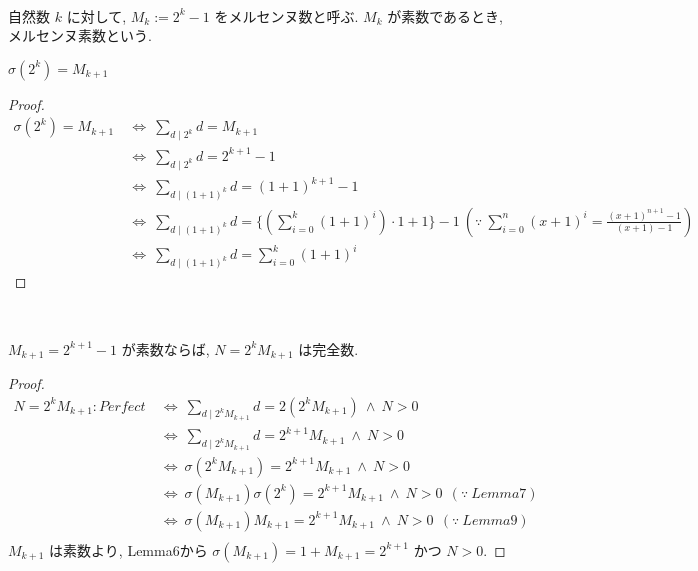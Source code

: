 \begin{definition}[メルセンヌ数]\label{Mersenne}\leanok~\

自然数 \(k\) に対して, \(M_k := 2^k - 1\) をメルセンヌ数と呼ぶ. \(M_k\) が素数であるとき,メルセンヌ素数という.

\end{definition}


\begin{lemma}\label{sigma_two_pow_eq_mersenne_succ}\leanok
{}
\(\sigma(2^k) = M_{k+1}\)
\end{lemma}

\begin{proof}
\begin{align*}
  \sigma(2^k) = M_{k+1} ~&\Leftrightarrow~ \sum_{d \mid 2^k} d = M_{k+1}\\
                        ~&\Leftrightarrow~ \sum_{d \mid 2^k} d = 2^{k+1} - 1\\
                        ~&\Leftrightarrow~ \sum_{d \mid (1+1)^k} d = (1+1)^{k+1} - 1\\
                        ~&\Leftrightarrow~ \sum_{d \mid (1+1)^k} d = \{(\sum_{i=0}^{k}(1+1)^i) \cdot 1 + 1\} - 1
                        ~(\because ~\sum_{i=0}^{n} (x+1)^i = \frac{(x+1)^{n+1}-1}{(x+1)-1})\\
                        ~&\Leftrightarrow~ \sum_{d \mid (1+1)^k} d = \sum_{i=0}^{k} (1+1)^i
\end{align*}
\end{proof}


\begin{theorem}[Euclid I]\label{perfect_two_pow_mul_mersenne_of_prime}
\leanok
{}~\

\(M_{k+1} = 2^{k+1} - 1\) が素数ならば, \(N = 2^kM_{k+1}\) は完全数.

\end{theorem}

\begin{proof}
\begin{align*}
N = 2^kM_{k+1} : Perfect ~&\Leftrightarrow~ \sum_{d \mid 2^kM_{k+1}} d = 2(2^kM_{k+1}) ~\wedge~ N > 0\\
                         ~&\Leftrightarrow~ \sum_{d \mid 2^kM_{k+1}} d = 2^{k+1}M_{k+1} ~\wedge~ N > 0\\
                         ~&\Leftrightarrow~ \sigma(2^kM_{k+1}) = 2^{k+1}M_{k+1} ~\wedge~ N > 0\\
                         ~&\Leftrightarrow~ \sigma(M_{k+1})\sigma(2^k) = 2^{k+1}M_{k+1} ~\wedge~ N > 0~~(\because~Lemma7)\\
                         ~&\Leftrightarrow~ \sigma(M_{k+1})M_{k+1} = 2^{k+1}M_{k+1} ~\wedge~ N > 0~~(\because~Lemma9)\\
\end{align*}
\(M_{k+1}\) は素数より, Lemma6から \(\sigma(M_{k+1}) = 1 + M_{k+1} = 2^{k+1}\) かつ \(N > 0\).
\end{proof}


